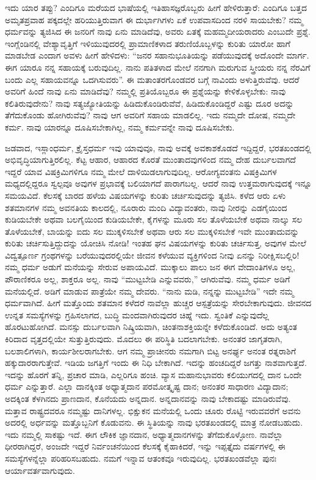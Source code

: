 ಇದು ಯಾರ ತಪ್ಪು? ಎಂದಿಗೂ ಮರೆಯದ ಭಾಷೆಯಲ್ಲಿ ಇತಿಹಾಸಜ್ಞರೊಬ್ಬರು ಹೀಗೆ ಹೇಳಿರುತ್ತಾರೆ: ಎಂದಿಗೂ ಬತ್ತದ ಅಮೃತಪ್ರವಾಹ ಪಕ್ಕದಲ್ಲೇ ಹರಿಯುತ್ತಿರುವಾಗ ಈ ದುರ್ಭಾಗಿಗಳು ಏಕೆ ಉಪವಾಸದಿಂದ ನರಳಿ ಸಾಯಬೇಕು? ನಮ್ಮ ಧರ್ಮವನ್ನು ತ್ಯಜಿಸಿದ ಈ ಜನರಿಗೆ ನಾವು ಏನು ಮಾಡಿದೆವು, ಅವರು ಏತಕ್ಕೆ ಮಹಮ್ಮದೀಯರಾದರು ಎಂಬುದೇ ಪ್ರಶ್ನೆ. ಇಂಗ್ಲೆಂಡಿನಲ್ಲಿ ವೇಶ್ಯಾವೃತ್ತಿಗೆ ಇಳಿಯುವುದರಲ್ಲಿ ಪ್ರಾಮಾಣಿಕಳಾದ ತರುಣಿಯೊಬ್ಬಳನ್ನು ಕುರಿತು ಯಾರೋ ಹಾಗೆ ಮಾಡಬೇಡ ಎಂದಾಗ ಅವಳು ಹೀಗೆ ಹೇಳಿದಳು: “ಜನರ ಸಹಾನುಭೂತಿಯನ್ನು ಪಡೆಯುವುದಕ್ಕೆ ಅದೊಂದೇ ಮಾರ್ಗ. ಈಗ ಯಾರೂ ನನ್ನ ಸಹಾಯಕ್ಕೆ ಬರುವುದಿಲ್ಲ. ನಾನು ಪತಿತಳಾದ ಮೇಲೆ ನನಗಾಗಿ ಮರುಗುವ ಸ್ತ್ರೀಯರು ನನ್ನ ನೆರವಿಗೆ ಬಂದು ಎಲ್ಲ ಸಹಾಯವನ್ನೂ ಒದಗಿಸುವರು”. ಈ ಮತಾಂತರಗೊಂಡವರ ಬಗ್ಗೆ ನಾವಿಂದು ಅಳುತ್ತಿರುವೆವು. ಆದರೆ ಅವರಿಗೆ ಹಿಂದೆ ನಾವು ಏನು ಮಾಡಿದೆವು? ನಮ್ಮಲ್ಲಿ ಪ್ರತಿಯೊಬ್ಬರೂ ಈ ಪ್ರಶ್ನೆಯನ್ನು ಕೇಳಿಕೊಳ್ಳಬೇಕು: ನಾವು ಕಲಿತಿರುವುದೇನು? ನಾವು ಸತ್ಯಜ್ಯೋತಿಯನ್ನು ಹಿಡಿದುಕೊಂಡಿರುವೆವೆ, ಹಿಡಿದುಕೊಂಡಿದ್ದರೆ ಎಷ್ಟು ದೂರ ಅದನ್ನು ತೆಗೆದು\-ಕೊಂಡು ಹೋಗಿರುವೆವು? ನಾವು ಆಗ ಅವರಿಗೆ ಸಹಾಯ ಮಾಡಲಿಲ್ಲ. ಇದು ನಮ್ಮದೇ ದೋಷ, ನಮ್ಮದೇ ಕರ್ಮ. ನಾವು ಯಾರನ್ನೂ ದೂಷಿಸಬೇಕಾಗಿಲ್ಲ, ನಮ್ಮ ಕರ್ಮವನ್ನೇ ನಾವು ದೂಷಿಸಬೇಕು.

ಜಡವಾದ, ಇಸ್ಲಾಂಧರ್ಮ, ಕ್ರೈಸ್ತಧರ್ಮ ಇವು ಯಾವುವೂ, ನಾವು ಅವಕ್ಕೆ ಅವಕಾಶಕೊಡದೆ ಇದ್ದಿದ್ದರೆ, ಭರತಖಂಡದಲ್ಲಿ ಅಭಿವೃದ್ಧಿಯಾಗುತ್ತಿರಲಿಲ್ಲ. ಕೆಟ್ಟ ಆಹಾರ, ಆಹಾರದ ಕೊರತೆ ಮುಂತಾದವುಗಳಿಂದ ನಮ್ಮ ದೇಹ ದುರ್ಬಲವಾಗದೆ ಇದ್ದರೆ ಯಾವ ವಿಷಕ್ರಿಮಿಗಳಿಗೂ ನಮ್ಮ ಮೇಲೆ ದಾಳಿಯಿಡಲಾಗುವುದಿಲ್ಲ. ಆರೋಗ್ಯವಂತನು ವಿಷಕ್ರಿಮಿಗಳ ಮಧ್ಯದಲ್ಲಿದ್ದರೂ ಸ್ವಲ್ಪವೂ ಅವುಗಳ ಪ್ರಭಾವಕ್ಕೆ ಬಲಿಯಾಗದೆ ಪಾರಾಗಬಲ್ಲ. ಆದರೆ ನಾವು ಉತ್ತಮರಾಗುವುದಕ್ಕೆ ಇನ್ನೂ ಸಮಯವಿದೆ. ಕೆಲಸಕ್ಕೆ ಬಾರದ ಹಳೆಯ ವಿಷಯಗಳನ್ನು ಕುರಿತು ಚರ್ಚಿಸುವುದನ್ನು ತ್ಯಜಿಸಿ. ಕಳೆದ ಆರು ಏಳು ಶತಮಾನಗಳ ನಮ್ಮ ಅವನತಿಯ ಕಾಲದಲ್ಲಿ, ನೂರಾರು ಮಂದಿ ವಿದ್ಯಾವಂತರು, ನಾವು ನೀರನ್ನು ಎಡಗೈಯಿಂದ ಕುಡಿಯಬೇಕೇ ಅಥವಾ ಬಲಗೈಯಿಂದ ಕುಡಿಯಬೇಕೇ, ಕೈಗಳನ್ನು ಮೂರು ಸಲ ತೊಳೆಯಬೇಕೆ ಅಥವಾ ನಾಲ್ಕು ಸಲ ತೊಳೆಯಬೇಕೆ, ಬಾಯನ್ನು ಐದು ಸಲ ಮುಕ್ಕಳಿಸಬೇಕೆ ಅಥವಾ ಆರು ಸಲ ಮುಕ್ಕಳಿಸಬೇಕೆ ಇವೇ ಮುಂತಾದುವನ್ನು ಕುರಿತು ಚರ್ಚಿಸುತ್ತಿದ್ದುದನ್ನು ಯೋಚಿಸಿ ನೋಡಿ! ಇಂತಹ ಘನ ವಿಷಯಗಳನ್ನು ಕುರಿತು ಚರ್ಚಿಸುತ್ತ, ಅವುಗಳ ಮೇಲೆ ವಿದ್ವತ್ಪೂರ್ಣ ಗ್ರಂಥಗಳನ್ನು ಬರೆಯುವುದರಲ್ಲಿಯೇ ಜೀವನ ಕಳೆಯುವ ವ್ಯಕ್ತಿಗಳಿಂದ ನೀವು ಏನನ್ನು ನಿರೀಕ್ಷಿಸಬಲ್ಲಿರಿ! ನಮ್ಮ ಧರ್ಮ ಅಡುಗೆ ಮನೆಯನ್ನು ಸೇರುವ ಅಪಾಯವಿದೆ. ಮುಕ್ಕಾಲು ಪಾಲು ಜನ ಈಗ ವೇದಾಂತಿಗಳೂ ಅಲ್ಲ, ಪೌರಾಣಿಕರೂ ಅಲ್ಲ, ಶಾಕ್ತರೂ ಅಲ್ಲ. ನಾವು “ಮುಟ್ಟಬೇಡಿ ಎನ್ನುವವರು,” ಆಗಿರುವೆವು. ನಮ್ಮ ಧರ್ಮ ಅಡಿಗೆ ಮನೆಯಲ್ಲಿದೆ. ಅಡಿಗೆ ಮಾಡುವ ಪಾತ್ರೆಯೇ ನಮ್ಮ ದೇವರು. “ನಾನು ಮಡಿ, ನನ್ನನ್ನು ಮುಟ್ಟಬೇಡಿ” ಇದೇ ನಮ್ಮ ಧರ್ಮವಾಗಿದೆ. ಹೀಗೆ ಮತ್ತೊಂದು ಶತಮಾನ ಕಳೆದರೆ ನಾವೆಲ್ಲಾ ಹುಚ್ಚರ ಆಸ್ಪತ್ರೆಯನ್ನು ಸೇರಬೇಕಾಗುವುದು. ಜೀವನದ ಉನ್ನತ ಸಮಸ್ಯೆಗಳನ್ನು ಗ್ರಹಿಸಲಾಗದ, ಬುದ್ಧಿ ಮಂದವಾಗಿರುವುದರ ಚಿಹ್ನೆ ಇದು. ಸ್ವಂತಿಕೆ ಎನ್ನುವುದೆಲ್ಲ ಹೊರಟುಹೋಗಿದೆ. ಮನಸ್ಸು ದುರ್ಬಲವಾಗಿ ನಿಷ್ಕ್ರಿಯವಾಗಿ, ಚಿಂತನಾಶಕ್ತಿಯನ್ನೇ ಕಳೆದುಕೊಂಡಿದೆ. ಅದು ಅತ್ಯಂತ ಕಿರಿದಾದ ವೃತ್ತದಲ್ಲಿಯೇ ಸುತ್ತುತ್ತಿರುವುದು. ಮೊದಲು ಈ ಪರಿಸ್ಥಿತಿ ಬದಲಾಗಬೇಕು. ಅನಂತರ ಜಾಗೃತರಾಗಿ, ಬಲಶಾಲಿಗಳಾಗಿ, ಕಾರ್ಯಶೀಲರಾಗಬೇಕು. ಆಗ ನಮ್ಮ ಪ್ರಾಚೀನರು ನಮಗಾಗಿ ಬಿಟ್ಟ ಅನರ್ಘ್ಯ ಅನಂತ ರತ್ನರಾಶಿಗೆ ಹಕ್ಕುದಾರರಾಗುತ್ತೇವೆ. ಇಡಿಯ ಜಗತ್ತಿಗೆ ಇಂದು ಈ ನಿಧಿ ಬೇಕಾಗಿದೆ. ಇದನ್ನು ಹಂಚದಿದ್ದರೆ ಜಗತ್ತು ನಾಶವಾಗುತ್ತದೆ. ಇದನ್ನು ಹೊರಗೆ ತನ್ನಿ, ಪ್ರಚಾರ ಮಾಡಿ, ಎಲ್ಲರಿಗೂ ಹಂಚಿ. ವ್ಯಾಸ ಮಹಾನುಭಾವರು ಕಲಿಯುಗದಲ್ಲಿ ದಾನ ಒಂದೇ ಧರ್ಮ ಎನ್ನುತ್ತಾರೆ. ಎಲ್ಲಾ ದಾನಕ್ಕಿಂತ ಅಧ್ಯಾತ್ಮದಾನ ಪರಮೋತ್ಕೃಷ್ಟ ದಾನ; ಅನಂತರ ಸಾಧಾರಣ ವಿದ್ಯಾದಾನ; ಅದಕ್ಕಿಂತ ಕೆಳಗಿನದು ಪ್ರಾಣದಾನ, ಕೊನೆಯದು ಅನ್ನದಾನ. ಅನ್ನದಾನವನ್ನು ನಾವು ಬೇಕಾದಷ್ಟು ಮಾಡಿರುವೆವು. ಮತ್ತಾವ ರಾಷ್ಟ್ರದವರೂ ನಮ್ಮಷ್ಟು ದಾನಿಗಳಲ್ಲ. ಭಿಕ್ಷುಕನ ಮನೆಯಲ್ಲಿ ಒಂದು ಚೂರು ರೊಟ್ಟಿ ಇರುವವರೆಗೆ ಅವನು ಅದರಲ್ಲಿ ಅರ್ಧವನ್ನು ಮತ್ತೊಬ್ಬನಿಗೆ ಕೊಡುವನು. ಈ ಸ್ಥಿತಿಯನ್ನು ನಾವು ಭರತಖಂಡದಲ್ಲಿ ಮಾತ್ರ ನೋಡಬಹುದು. ಇದು ನಮ್ಮಲ್ಲಿ ಸಾಕಷ್ಟು ಇದೆ. ಈಗ ಲೌಕಿಕ ಜ್ಞಾನದಾನ, ಅಧ್ಯಾತ್ಮದಾನಗಳನ್ನು ತೆಗೆದುಕೊಳ್ಳೋಣ. ನಾವೆಲ್ಲಾ ಧೀರರಾಗಿದ್ದರೆ, ಅಂಜದೇ ಇದ್ದರೆ ನಿರ್ವಂಚನೆಯಿಂದ ಕೆಲಸಕ್ಕೆ ಕೈಹಾಕಿದರೆ, ಇನ್ನು ಇಪ್ಪತ್ತೈದು ವರ್ಷಗಳಲ್ಲಿ ಈ ಸಮಸ್ಯೆಗಳನ್ನೆಲ್ಲಾ ಪರಿಹರಿಸಬಹುದು. ನಮಗೆ ಇನ್ನಾವ ಆತಂಕವೂ ಇರುವುದಿಲ್ಲ. ಭರತಖಂಡವೆಲ್ಲಾ ಪುನಃ ಆರ್ಯಾವರ್ತವಾಗುವುದು.

